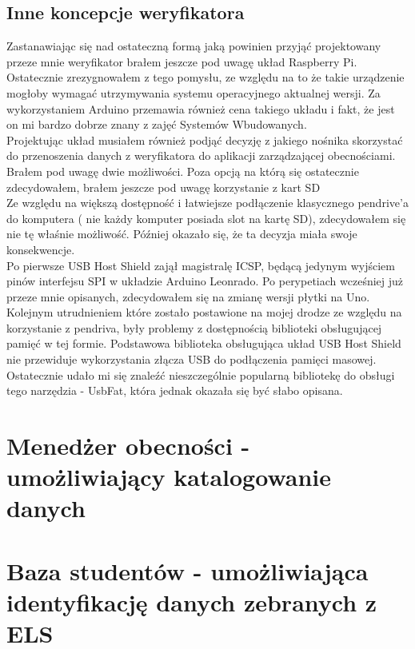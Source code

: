 \documentclass[declaration,shortabstract, mgr]{iithesis}
\begin{document}
\subsection{Inne koncepcje weryfikatora}
\indent Zastanawiając się nad ostateczną formą jaką powinien przyjąć projektowany przeze mnie weryfikator brałem jeszcze pod uwagę układ Raspberry Pi. Ostatecznie zrezygnowałem z tego pomysłu, ze względu na to że takie urządzenie mogłoby wymagać utrzymywania systemu operacyjnego aktualnej wersji. Za wykorzystaniem Arduino przemawia również cena takiego układu i fakt, że jest on mi bardzo dobrze znany z zajęć Systemów Wbudowanych.\\
\indent Projektując układ musiałem również podjąć decyzję z jakiego nośnika skorzystać do przenoszenia danych z weryfikatora do aplikacji zarządzającej obecnościami. Brałem pod uwagę dwie możliwości. Poza opcją na którą się ostatecznie zdecydowałem, brałem jeszcze pod uwagę korzystanie z kart SD \\
\indent Ze względu na większą dostępność i łatwiejsze podłączenie klasycznego pendrive'a do komputera ( nie każdy komputer posiada slot na kartę SD), zdecydowałem się nie tę właśnie możliwość. Później okazało się, że ta decyzja miała swoje konsekwencje.\\
\indent Po pierwsze USB Host Shield zajął magistralę ICSP, będącą jedynym wyjściem pinów interfejsu SPI w układzie Arduino Leonrado. Po perypetiach wcześniej już przeze mnie opisanych, zdecydowałem się na zmianę wersji płytki na Uno. \\
\indent Kolejnym utrudnieniem które zostało postawione na mojej drodze ze względu na korzystanie z pendriva, były problemy z dostępnością biblioteki obsługującej pamięć w tej formie. Podstawowa biblioteka obsługująca układ USB Host Shield nie przewiduje wykorzystania złącza USB do podłączenia pamięci masowej. \\
\indent Ostatecznie udało mi się znaleźć nieszczególnie popularną bibliotekę do obsługi tego narzędzia - UsbFat, która jednak okazała się być słabo opisana.
\section{Menedżer obecności - umożliwiający katalogowanie danych}
\section{Baza studentów - umożliwiająca identyfikację danych zebranych z ELS}
\end{document}
